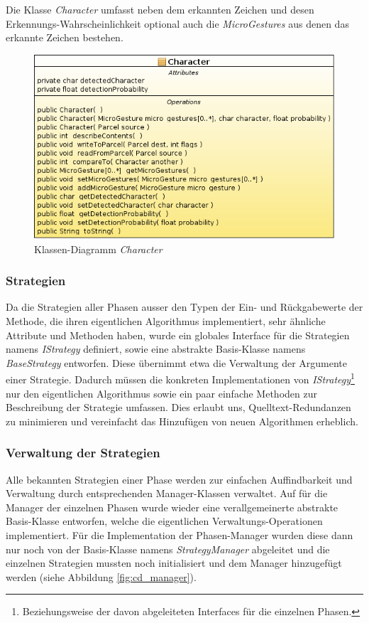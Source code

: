 Die Klasse \emph{Character} umfasst neben dem erkannten Zeichen und desen Erkennungs-Wahrscheinlichkeit optional auch die \emph{MicroGestures} aus denen das erkannte Zeichen bestehen.

\begin{figure}[h!]
   \centering
   \includegraphics[scale=0.5]{img/uml_cd_char} 
   \caption{Klassen-Diagramm \emph{Character}}
   \label{fig:cd_character}
\end{figure}

\subsubsection{Strategien}

Da die Strategien aller Phasen ausser den Typen der Ein- und Rückgabewerte der Methode, die ihren eigentlichen Algorithmus implementiert, sehr ähnliche Attribute und Methoden haben, wurde ein globales Interface für die Strategien namens \emph{IStrategy} definiert, sowie eine abstrakte Basis-Klasse namens \emph{BaseStrategy} entworfen. Diese übernimmt etwa die Verwaltung der Argumente einer Strategie. Dadurch müssen die konkreten Implementationen von \emph{IStrategy}\footnote{Beziehungsweise der davon abgeleiteten Interfaces für die einzelnen Phasen.} nur den eigentlichen Algorithmus sowie ein paar einfache Methoden zur Beschreibung der Strategie umfassen. Dies erlaubt uns, Quelltext-Redundanzen zu minimieren und vereinfacht das Hinzufügen von neuen Algorithmen erheblich.

\subsubsection{Verwaltung der Strategien}

Alle bekannten Strategien einer Phase werden zur einfachen Auffindbarkeit und Verwaltung durch entsprechenden Manager-Klassen verwaltet. Auf für die Manager der einzelnen Phasen wurde wieder eine verallgemeinerte abstrakte Basis-Klasse entworfen, welche die eigentlichen Verwaltungs-Operationen implementiert. Für die Implementation der Phasen-Manager wurden diese dann nur noch von der Basis-Klasse namens \emph{StrategyManager} abgeleitet und die einzelnen Strategien mussten noch initialisiert und dem Manager hinzugefügt werden (siehe Abbildung \ref{fig:cd_manager}).

